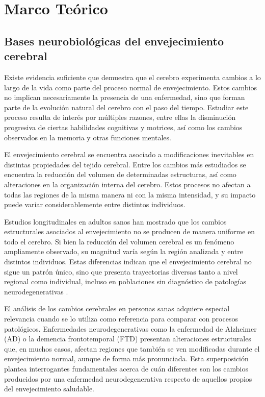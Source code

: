 \chapter{Marco Teórico}
\label{chapter:marco_teorico}

\section{Bases neurobiológicas del envejecimiento cerebral}
\label{sec:bases_neuro}

Existe evidencia suficiente que demuestra que el cerebro experimenta cambios a lo largo de la vida como parte del proceso normal de envejecimiento. Estos cambios no implican necesariamente la presencia de una enfermedad, sino que forman parte de la evolución natural del cerebro con el paso del tiempo. Estudiar este proceso resulta de interés por múltiples razones, entre ellas la disminución progresiva de ciertas habilidades cognitivas y motrices, así como los cambios observados en la memoria y otras funciones mentales.

El envejecimiento cerebral se encuentra asociado a modificaciones inevitables en distintas propiedades del tejido cerebral. Entre los cambios más estudiados se encuentra la reducción del volumen de determinadas estructuras, así como alteraciones en la organización interna del cerebro. Estos procesos no afectan a todas las regiones de la misma manera ni con la misma intensidad, y su impacto puede variar considerablemente entre distintos individuos.

Estudios longitudinales en adultos sanos han mostrado que los cambios estructurales asociados al envejecimiento no se producen de manera uniforme en todo el cerebro. Si bien la reducción del volumen cerebral es un fenómeno ampliamente observado, su magnitud varía según la región analizada y entre distintos individuos. Estas diferencias indican que el envejecimiento cerebral no sigue un patrón único, sino que presenta trayectorias diversas tanto a nivel regional como individual, incluso en poblaciones sin diagnóstico de patologías neurodegenerativas \cite{raz2005regional}.

El análisis de los cambios cerebrales en personas sanas adquiere especial relevancia cuando se lo utiliza como referencia para comparar con procesos patológicos. Enfermedades neurodegenerativas como la enfermedad de Alzheimer (AD) o la demencia frontotemporal (FTD) presentan alteraciones estructurales que, en muchos casos, afectan regiones que también se ven modificadas durante el envejecimiento normal, aunque de forma más pronunciada. Esta superposición plantea interrogantes fundamentales acerca de cuán diferentes son los cambios producidos por una enfermedad neurodegenerativa respecto de aquellos propios del envejecimiento saludable.

